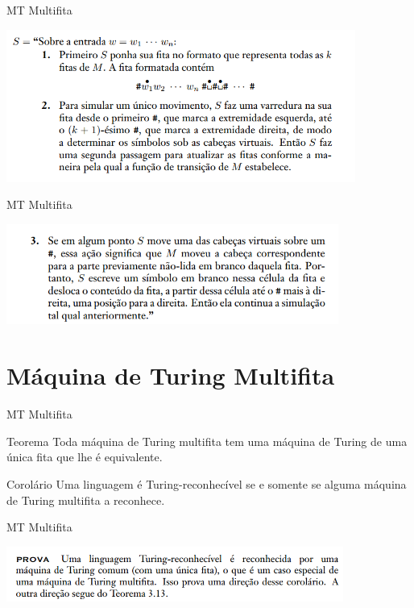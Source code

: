 \documentclass[xcolor=dvipsnames,table]{beamer}
\begin{document}
	\begin{frame}{MT Multifita}
		\begin{center}
			\includegraphics[height=5cm]{images/teoMt-1.png}
		\end{center}
	\end{frame}
	
	\begin{frame}{MT Multifita}
		\begin{center}
			\includegraphics[height=3.3cm]{images/teoMt-2.png}
		\end{center}
	\end{frame}
	
\section{Máquina de Turing Multifita}
	
	\begin{frame}{MT Multifita}
		\begin{block}{Teorema}
			Toda máquina de Turing multifita tem uma máquina de Turing de uma única fita que lhe é equivalente.
		\end{block}
		\begin{block}{Corolário}
			Uma linguagem é Turing-reconhecível se e somente se alguma máquina de Turing multifita a reconhece.
		\end{block}
	\end{frame}
	
	\begin{frame}{MT Multifita}
		\begin{center}
			\includegraphics[height=1.8cm]{images/provaCorolario.png}
		\end{center}
	\end{frame}
	
\end{document}
